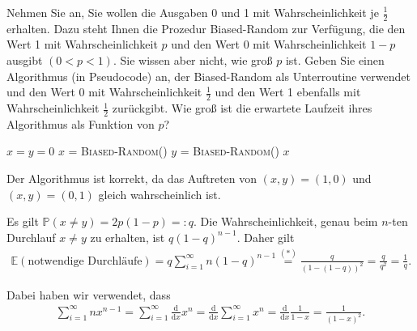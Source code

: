 
\begin{exercise}

\phantom{}Nehmen Sie an, Sie wollen die Ausgaben 0 und 1 mit Wahrscheinlichkeit je $\frac{1}{2}$ erhalten. Dazu steht Ihnen die Prozedur Biased-Random zur Verfügung, die den Wert 1 mit Wahrscheinlichkeit $p$ und den Wert 0 mit Wahrscheinlichkeit $1-p$ ausgibt $(0 < p < 1)$. Sie wissen aber nicht, wie groß $p$ ist. Geben Sie einen Algorithmus (in Pseudocode) an, der Biased-Random als Unterroutine verwendet und den Wert 0 mit Wahrscheinlichkeit $\frac{1}{2}$ und den Wert 1 ebenfalls mit Wahrscheinlichkeit $\frac{1}{2}$ zurückgibt. Wie groß ist die erwartete Laufzeit ihres Algorithmus als Funktion von $p$?

\end{exercise}



\begin{solution}
\phantom{}

  \begin{algorithm}
      \begin{algorithmic}[1]
          \State $x = y = 0$
              \State $x$ = \textsc{Biased-Random()}
              \State $y$ = \textsc{Biased-Random()}
          \EndWhile
          \Return $x$
          \EndProcedure
      \end{algorithmic}
  \end{algorithm}

Der Algorithmus ist \glqq korrekt\grqq{}, da das Auftreten von $(x, y) = (1, 0)$ und $(x, y) = (0, 1)$ gleich wahrscheinlich ist.

Es gilt $\mathbb P(x \neq y) = 2p(1-p) =\colon q$. Die Wahrscheinlichkeit, genau beim $n$-ten Durchlauf $x \neq y$ zu erhalten, ist $q (1-q)^{n-1}$. Daher gilt
\begin{align*}
    \mathbb E(\text{notwendige Durchläufe}) = q \sum_{i = 1}^\infty n (1-q)^{n-1} \stackrel{(\ast)}{=} \frac{q}{(1-(1-q))^2} = \frac{q}{q^2} = \frac{1}{q}.
\end{align*}

Dabei haben wir verwendet, dass
\begin{align}\tag{$\ast$}
    \sum_{i = 1}^\infty nx^{n-1} = \sum_{i = 1}^\infty \frac{\mathrm d}{\mathrm dx} x^n =
    \frac{\mathrm d}{\mathrm dx} \sum_{i = 1}^\infty x^n =
    \frac{\mathrm d}{\mathrm dx} \frac{1}{1-x} = \frac{1}{(1-x)^2}.
\end{align}

\end{solution}
